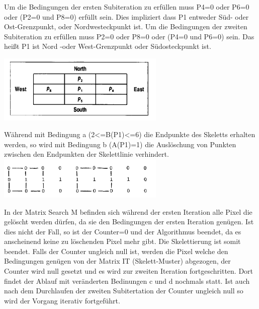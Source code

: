 \documentclass[
	12pt,
	a4paper,
	BCOR10mm,
	DIV14,
	listof=totoc,
	bibliography=totoc,
	headsepline
]{scrreprt}
\begin{document}
Um die Bedingungen der ersten Subiteration zu erfüllen muss
P4=0 oder P6=0 oder (P2=0 und P8=0)  erfüllt sein.
Dies impliziert dass P1 entweder Süd- oder Ost-Grenzpunkt, oder Nordwesteckpunkt ist.
Um die Bedingungen der zweiten Subiteration zu erfüllen muss
P2=0 oder P8=0 oder (P4=0 und P6=0) sein.
Das heißt P1 ist Nord -oder West-Grenzpunkt oder Südosteckpunkt ist.

\includegraphics[width=8cm]{Res/Orientierung.png}


Während mit Bedingung a (2<=B(P1)<=6) die Endpunkte des Skeletts erhalten werden, so wird mit Bedingung b (A(P1)=1) die Auslöschung von Punkten zwischen den Endpunkten der Skelettlinie verhindert.\\

\includegraphics[width=8cm]{Res/EndpktVerbheit.png}

In der Matrix Search M befinden sich während der ersten Iteration alle Pixel die gelöscht werden dürfen, da sie den Bedingungen der ersten Iteration genügen. Ist dies nicht der Fall, so ist der Counter=0 und der Algorithmus beendet, da es anscheinend keine zu löschenden Pixel mehr gibt. Die Skelettierung ist somit beendet.
Falls der Counter ungleich null ist, werden die Pixel welche den Bedingungen genügen von der Matrix IT (Skelett-Muster) abgezogen, der Counter wird null gesetzt und es wird zur zweiten Iteration fortgeschritten. Dort findet der Ablauf mit veränderten Bedinungen c und d nochmals statt. Ist auch nach dem Durchlaufen der zweiten Subitertation der Counter ungleich null so wird der Vorgang iterativ fortgeführt.\\
\end{document}
